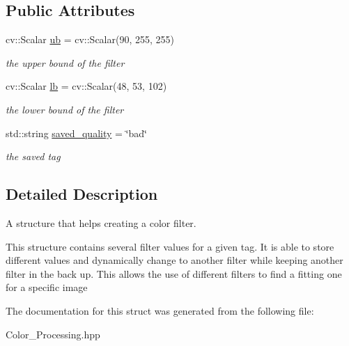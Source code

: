 \subsection*{Public Attributes}
\begin{DoxyCompactItemize}
\item 
\mbox{\label{struct_image_processing_1_1_h_s_v_filter_range_a739193d1bd8a9deb6bc3c1639add2156}} 
cv\+::\+Scalar \mbox{\hyperlink{struct_image_processing_1_1_h_s_v_filter_range_a739193d1bd8a9deb6bc3c1639add2156}{ub}} = cv\+::\+Scalar(90, 255, 255)
\begin{DoxyCompactList}\small\item\em the upper bound of the filter \end{DoxyCompactList}\item 
\mbox{\label{struct_image_processing_1_1_h_s_v_filter_range_abdd2bdaacd9ab1270b470e3913e0340e}} 
cv\+::\+Scalar \mbox{\hyperlink{struct_image_processing_1_1_h_s_v_filter_range_abdd2bdaacd9ab1270b470e3913e0340e}{lb}} = cv\+::\+Scalar(48, 53, 102)
\begin{DoxyCompactList}\small\item\em the lower bound of the filter \end{DoxyCompactList}\item 
\mbox{\label{struct_image_processing_1_1_h_s_v_filter_range_a799a98eb547d036576f3d690ac25179f}} 
std\+::string \mbox{\hyperlink{struct_image_processing_1_1_h_s_v_filter_range_a799a98eb547d036576f3d690ac25179f}{saved\+\_\+quality}} = \char`\"{}bad\char`\"{}
\begin{DoxyCompactList}\small\item\em the saved tag \end{DoxyCompactList}\end{DoxyCompactItemize}


\subsection{Detailed Description}
A structure that helps creating a color filter. 

This structure contains several filter values for a given tag. It is able to store different values and dynamically change to another filter while keeping another filter in the back up. This allows the use of different filters to find a fitting one for a specific image 

The documentation for this struct was generated from the following file\+:\begin{DoxyCompactItemize}
\item 
Color\+\_\+\+Processing.\+hpp\end{DoxyCompactItemize}
